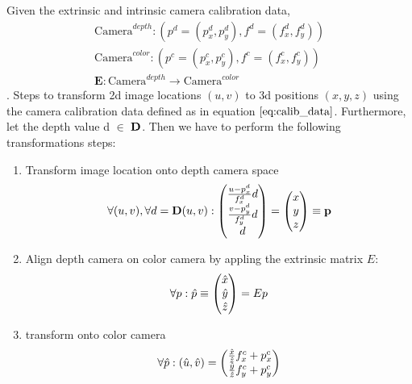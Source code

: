 Given the extrinsic and intrinsic camera calibration data,
\begin{equation}
\begin{aligned}
	\text{Camera}^{depth} : \left( p^d = (p_x^d, p_y^d), f^d = (f_x^d, f_y^d)\right) \\
	\text{Camera}^{color} : \left( p^c = (p_x^c, p_y^c), f^c = (f_x^c, f_y^c)\right) \\
	\textbf{E} : \text{Camera}^{depth} \rightarrow \text{Camera}^{color}
\end{aligned}
\label{eq:calib_data}
\end{equation}.
Steps to transform 2d image locations $\left( u, v \right)$ to 3d positions $\left( x, y, z \right)$ using the camera calibration data defined as in equation $\ref{eq:calib_data}$. Furthermore, let the depth value d $\in$ $\bf{D}$. Then we have to perform the following transformations steps:
\begin{enumerate}
\item Transform image location onto depth camera space
\begin{equation}
	\forall (u, v), \forall d = \textbf{D}(u,v): \colvec[\frac{u - p_x^d}{f_x^d} d]{\frac{v - p_y^d}{f_y^d} d}{d} = \colvec[x]{y}{z} \equiv \bf{p}
\end{equation}
\item Align depth camera on color camera by appling the extrinsic matrix $E$:
\begin{equation}
	\forall p: \hat{p} \equiv \colvec[\hat{x}]{\hat{y}}{\hat{z}} =  E p
\end{equation}
\item transform onto color camera
\begin{equation}
	\forall \hat{p} : \left( \hat{u}, \hat{v}\right) = \colvec{\frac{\hat{x}}{\hat{z}} f_x^c + p_x^c}{\frac{\hat{y}}{\hat{z}} f_y^c + p_y^c}
\end{equation}
\end{enumerate}

